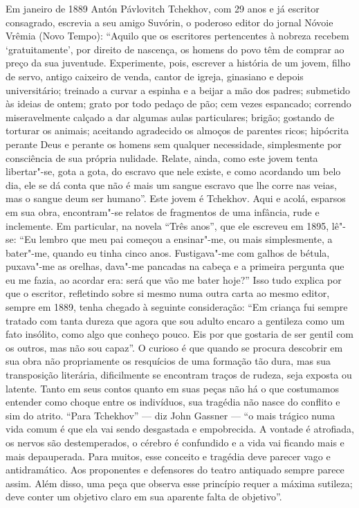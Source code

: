 Em janeiro de 1889 Antón Pávlovitch Tchekhov, com 29 anos e já escritor
consagrado, escrevia a seu amigo Suvórin, o poderoso editor do jornal
Nóvoie Vrêmia (Novo Tempo): ``Aquilo que os escritores pertencentes à
nobreza recebem `gratuitamente', por direito de nascença, os homens do
povo têm de comprar ao preço da sua juventude. Experimente, pois,
escrever a história de um jovem, filho de servo, antigo caixeiro de
venda, cantor de igreja, ginasiano e depois universitário; treinado a
curvar a espinha e a beijar a mão dos padres; submetido às ideias de
ontem; grato por todo pedaço de pão; cem vezes espancado; correndo
miseravelmente calçado a dar algumas aulas particulares; brigão;
gostando de torturar os animais; aceitando agradecido os almoços de
parentes ricos; hipócrita perante Deus e perante os homens sem qualquer
necessidade, simplesmente por consciência de sua própria nulidade.
Relate, ainda, como este jovem tenta libertar"-se, gota a gota, do
escravo que nele existe, e como acordando um belo dia, ele se dá conta
que não é mais um sangue escravo que lhe corre nas veias, mas o sangue
deum ser humano''. Este jovem é Tchekhov. Aqui e acolá, esparsos em sua
obra, encontram"-se relatos de fragmentos de uma infância, rude e
inclemente. Em particular, na novela ``Três anos'', que ele escreveu em
1895, lê"-se: ``Eu lembro que meu pai começou a ensinar"-me, ou mais
simplesmente, a bater"-me, quando eu tinha cinco anos. Fustigava"-me com
galhos de bétula, puxava"-me as orelhas, dava"-me pancadas na cabeça e a
primeira pergunta que eu me fazia, ao acordar era: será que vão me
bater hoje?'' Isso tudo explica por que o escritor, refletindo sobre si
mesmo numa outra carta ao mesmo editor, sempre em 1889, tenha chegado à
seguinte consideração: ``Em criança fui sempre tratado com tanta dureza
que agora que sou adulto encaro a gentileza como um fato insólito, como
algo que conheço pouco. Eis por que gostaria de ser gentil com os
outros, mas não sou capaz''. O curioso é que quando se procura descobrir
em sua obra não propriamente os resquícios de uma formação tão dura, mas
sua transposição literária, dificilmente se encontram traços de rudeza,
seja exposta ou latente. Tanto em seus contos quanto em suas peças não
há o que costumamos entender como choque entre os indivíduos, sua
tragédia não nasce do conflito e sim do atrito. ``Para Tchekhov'' --- diz
John Gassner --- ``o mais trágico numa vida comum é que ela vai sendo
desgastada e empobrecida. A vontade é atrofiada, os nervos são
destemperados, o cérebro é confundido e a vida vai ficando mais e mais
depauperada. Para muitos, esse conceito e tragédia deve parecer vago e
antidramático. Aos proponentes e defensores do teatro antiquado sempre
parece assim. Além disso, uma peça que observa esse princípio requer a
máxima sutileza; deve conter um objetivo claro em sua aparente falta de
objetivo''.


